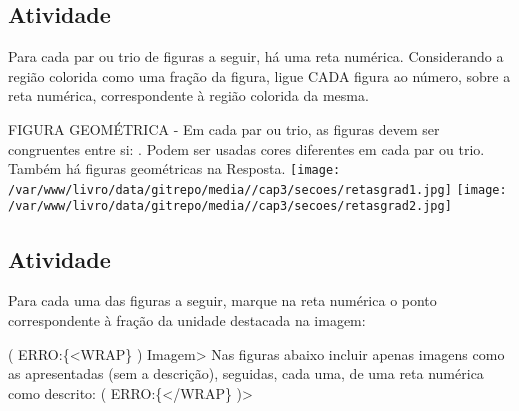 \documentclass[a4,12pt]{book}
\begin{document}
\subsection{Atividade}

Para cada par ou trio de figuras a seguir, há uma reta numérica. Considerando a região colorida como uma fração da figura, ligue CADA figura ao número, sobre a reta numérica, correspondente à região colorida da mesma.
\begin{imagem*}[breakable]{}{}   FIGURA GEOMÉTRICA - Em cada par ou trio, as figuras devem ser congruentes entre si: . Podem ser usadas cores diferentes em cada par ou trio. Também há figuras geométricas na Resposta.  
    \texttt{[image: /var/www/livro/data/gitrepo/media//cap3/secoes/retasgrad1.jpg]}     
    \texttt{[image: /var/www/livro/data/gitrepo/media//cap3/secoes/retasgrad2.jpg]}  
\end{imagem*}

\subsection{Atividade}

Para cada uma das figuras a seguir, marque na reta numérica o ponto correspondente à fração da unidade destacada na imagem:


( ERRO:\{<WRAP\} ) Imagem> Nas figuras abaixo incluir apenas imagens como as apresentadas (sem a descrição), seguidas, cada uma, de uma reta numérica como descrito:
( ERRO:\{</WRAP\} )>
\end{document}
